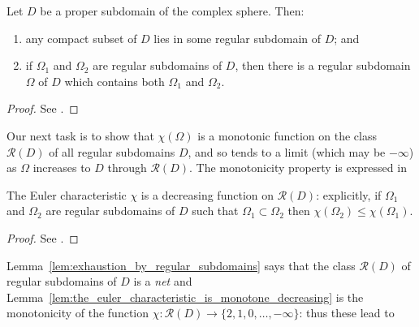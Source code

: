 \begin{lemma}
    \label{lem:exhaustion_by_regular_subdomains}
    Let $D$ be a proper subdomain of the complex sphere. Then:
    \begin{enumerate}[label=(\roman*)]
        \item any compact subset of $D$ lies in some regular subdomain of $D$;
        and
        \item if $\Omega_1$ and $\Omega_2$ are regular subdomains of $D$, then
        there is a regular subdomain $\Omega$ of $D$ which contains both
        $\Omega_1$ and $\Omega_2$.
    \end{enumerate}
\end{lemma}
\begin{proof}
    See \cite[91]{Beardon1991}.
\end{proof}

Our next task is to show that $\chi(\Omega)$ is a monotonic function on the
class $\mathcal{R}(D)$ of all regular subdomains $D$, and so tends to a limit
(which may be $-\infty$) as $\Omega$ increases to $D$ through $\mathcal{R}(D)$.
The monotonicity property is expressed in

\begin{lemma}
    \label{lem:the_euler_characteristic_is_monotone_decreasing}
    The Euler characteristic $\chi$ is a decreasing function on
    $\mathcal{R}(D)$: explicitly, if $\Omega_1$ and $\Omega_2$ are regular
    subdomains of $D$ such that $\Omega_1 \subset \Omega_2$ then $\chi(\Omega_2)
    \leq \chi(\Omega_1)$.
\end{lemma}
\begin{proof}
    See \cite[91]{Beardon1991}.
\end{proof}

Lemma~\ref{lem:exhaustion_by_regular_subdomains} says that the class
$\mathcal{R}(D)$ of regular subdomains of $D$ is a \emph{net} and
Lemma~\ref{lem:the_euler_characteristic_is_monotone_decreasing} is the
monotonicity of the function $\chi: \mathcal{R}(D) \to \{2, 1, 0, \dots,
-\infty\}$: thus these lead to


